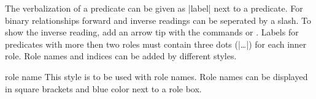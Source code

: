 \documentclass[a4paper,10pt]{article}
\begin{document}
\noindent
The verbalization of a predicate can be given as |label| next to a predicate. For binary relationships forward and inverse readings can be seperated by a slash. To show the inverse reading, add an arrow tip with the commands  or . Labels for predicates with more then two roles must contain three dots (|\ldots|) for each inner role. Role names and indices can be added by different styles.

\begin{figure}[h]
\centering
\begin{codeexample}[]
\end{codeexample}
\end{figure}

\begin{stylekey}{role name}
This style is to be used with role names. Role names can be displayed in square brackets and blue color next to a role box. %
\begin{codeexample}[width=3cm]
\end{codeexample}
\end{stylekey}
\end{document}
